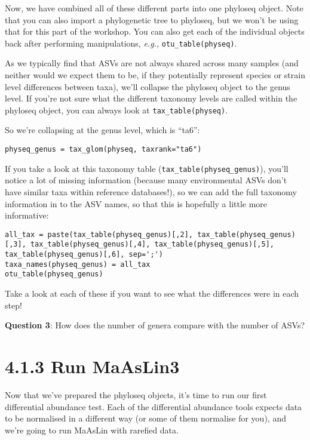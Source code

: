 \documentclass[
]{book}
\begin{document}
Now, we have combined all of these different parts into one phyloseq object. Note that you can also import a phylogenetic tree to phyloseq, but we won't be using that for this part of the workshop. You can also get each of the individual objects back after performing manipulations, \emph{e.g.,} \texttt{otu\_table(physeq)}.

As we typically find that ASVs are not always shared across many samples (and neither would we expect them to be, if they potentially represent species or strain level differences between taxa), we'll collapse the phyloseq object to the genus level. If you're not sure what the different taxonomy levels are called within the phyloseq object, you can always look at \texttt{tax\_table(physeq)}.

So we're collapsing at the genus level, which is ``ta6'':

\begin{verbatim}
physeq_genus = tax_glom(physeq, taxrank="ta6")
\end{verbatim}

If you take a look at this taxonomy table (\texttt{tax\_table(physeq\_genus)}), you'll notice a lot of missing information (because many environmental ASVs don't have similar taxa within reference databases!), so we can add the full taxonomy information in to the ASV names, so that this is hopefully a little more informative:

\begin{verbatim}
all_tax = paste(tax_table(physeq_genus)[,2], tax_table(physeq_genus)[,3], tax_table(physeq_genus)[,4], tax_table(physeq_genus)[,5], tax_table(physeq_genus)[,6], sep=';')
taxa_names(physeq_genus) = all_tax
otu_table(physeq_genus)
\end{verbatim}

Take a look at each of these if you want to see what the differences were in each step!

\textbf{Question 3}: How does the number of genera compare with the number of ASVs?

\section{4.1.3 Run MaAsLin3}\label{run-maaslin3}

Now that we've prepared the phyloseq objects, it's time to run our first differential abundance test. Each of the differential abundance tools expects data to be normalised in a different way (or some of them normalise for you), and we're going to run MaAsLin with rarefied data.
\end{document}
